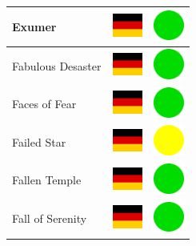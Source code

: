 \documentclass[12pt, a4paper, twoside]{report}
\begin{document}
\begin{center}
\begin{longtable}{|p{5cm}|p{2cm}|p{2cm}|}
 Exumer                                                     & \includegraphics[width=1cm]{../img/flags/de} &   \includegraphics[width=1cm]{../likes/y} \\ \hline
 Fabulous Desaster                                          & \includegraphics[width=1cm]{../img/flags/de} &   \includegraphics[width=1cm]{../likes/y} \\ \hline
 Faces of Fear                                              & \includegraphics[width=1cm]{../img/flags/de} &   \includegraphics[width=1cm]{../likes/y} \\ \hline
 Failed Star                                                & \includegraphics[width=1cm]{../img/flags/de} &   \includegraphics[width=1cm]{../likes/m} \\ \hline
 Fallen Temple                                              & \includegraphics[width=1cm]{../img/flags/de} &   \includegraphics[width=1cm]{../likes/y} \\ \hline
 Fall of Serenity                                           & \includegraphics[width=1cm]{../img/flags/de} &   \includegraphics[width=1cm]{../likes/y} \\ \hline

\end{longtable}
\end{center}
\end{document}
